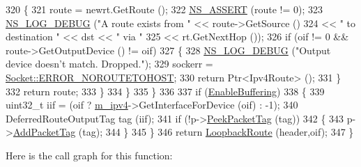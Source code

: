 \begin{DoxyCode}
320             \{
321               route = newrt.GetRoute ();
322               \hyperlink{assert_8h_a6dccdb0de9b252f60088ce281c49d052}{NS\_ASSERT} (route != 0);
323               \hyperlink{group__logging_ga413f1886406d49f59a6a0a89b77b4d0a}{NS\_LOG\_DEBUG} (\textcolor{stringliteral}{"A route exists from "} << route->GetSource ()
324                                                    << \textcolor{stringliteral}{" to destination "} << dst << \textcolor{stringliteral}{" via "}
325                                                    << rt.GetNextHop ());
326               \textcolor{keywordflow}{if} (oif != 0 && route->GetOutputDevice () != oif)
327                 \{
328                   \hyperlink{group__logging_ga413f1886406d49f59a6a0a89b77b4d0a}{NS\_LOG\_DEBUG} (\textcolor{stringliteral}{"Output device doesn't match. Dropped."});
329                   sockerr = \hyperlink{classns3_1_1Socket_ada1328c5ae0c28cb2a982caf8f6d6ccaa0f8ecb5a4ddbce3bade35fa12c3d49e8}{Socket::ERROR\_NOROUTETOHOST};
330                   \textcolor{keywordflow}{return} Ptr<Ipv4Route> ();
331                 \}
332               \textcolor{keywordflow}{return} route;
333             \}
334         \}
335     \}
336 
337   \textcolor{keywordflow}{if} (\hyperlink{classns3_1_1dsdv_1_1RoutingProtocol_a257bf2eb6e7eff700d12f00f2d9ec0e3}{EnableBuffering})
338     \{
339       uint32\_t iif = (oif ? \hyperlink{classns3_1_1dsdv_1_1RoutingProtocol_a955477c7f38e64762a264c24e3762af6}{m\_ipv4}->GetInterfaceForDevice (oif) : -1);
340       DeferredRouteOutputTag tag (iif);
341       \textcolor{keywordflow}{if} (!p->\hyperlink{classns3_1_1Packet_a1734de11f2ca1e78a7872461a0625168}{PeekPacketTag} (tag))
342         \{
343           p->\hyperlink{classns3_1_1Packet_a7400b8655852f5271c5957250d0141af}{AddPacketTag} (tag);
344         \}
345     \}
346   \textcolor{keywordflow}{return} \hyperlink{classns3_1_1dsdv_1_1RoutingProtocol_aadc3f2072721211ad452bcbe49762420}{LoopbackRoute} (header,oif);
347 \}
\end{DoxyCode}


Here is the call graph for this function\+:


